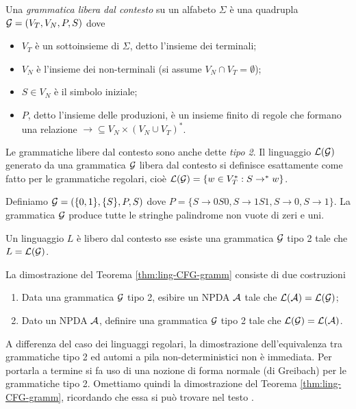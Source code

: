 \documentclass[runningheads,a4paper]{llncs}
\begin{document}
\begin{definition}\label{def:CFG}
Una \emph{grammatica libera dal contesto} su un alfabeto $\Sigma$ \`{e} una quadrupla $\mathcal{G} = (V_T,V_N,P,S)$ dove
\begin{itemize}
\item $V_T$ \`{e} un sottoinsieme di $\Sigma$, detto l'insieme dei terminali;
\item $V_N$ \`{e} l'insieme dei non-terminali (si assume $V_N \cap V_T = \emptyset$);
\item $S \in V_N$ \`{e} il simbolo iniziale;
\item $P$, detto l'insieme delle produzioni, \`{e} un insieme finito di regole che formano una relazione $\to \subseteq V_N \times (V_N \cup V_T)^*$.
\end{itemize}
\end{definition}

Le grammatiche libere dal contesto sono anche dette \emph{tipo 2}. Il linguaggio $\mathcal{L}(\mathcal{G})$ generato da una grammatica $\mathcal{G}$ libera dal contesto si definisce esattamente come fatto per le grammatiche regolari, cio\`{e} $\mathcal{L}(\mathcal{G}) = \{w \in V_T^* : S \to^* w\}$.

\begin{example}
Definiamo $\mathcal{G} = (\{0,1\},\{S\},P,S)$ dove $P = \{S \to 0S0, S \to 1S1,S \to 0, S \to 1\}$. La grammatica $\mathcal{G}$ produce tutte le stringhe palindrome non vuote di zeri e uni.
\end{example}

\begin{theorem}\label{thm:ling-CFG-gramm}
Un linguaggio $L$ \`{e} libero dal contesto sse esiste una grammatica $\mathcal{G}$ tipo 2 tale che $L = \mathcal{L}(\mathcal{G})$.
\end{theorem}

La dimostrazione del Teorema \ref{thm:ling-CFG-gramm} consiste di due costruzioni
\begin{enumerate}[(1)]
\item Data una grammatica $\mathcal{G}$ tipo 2, esibire un NPDA $\mathcal{A}$ tale che $\mathcal{L}(\mathcal{A}) = \mathcal{L}(\mathcal{G})$;
\item Dato un NPDA $\mathcal{A}$, definire una grammatica $\mathcal{G}$ tipo 2 tale che $\mathcal{L}(\mathcal{G}) = \mathcal{L}(\mathcal{A})$.
\end{enumerate}

A differenza del caso dei linguaggi regolari, la dimostrazione dell'equivalenza tra grammatiche tipo 2 ed automi a pila non-deterministici non \`{e} immediata. Per portarla a termine si fa uso di una nozione di forma normale (di Greibach) per le grammatiche tipo 2. Omettiamo quindi la dimostrazione del Teorema \ref{thm:ling-CFG-gramm}, ricordando che essa si pu\`{o} trovare nel testo \cite{HMU}.
\end{document}
